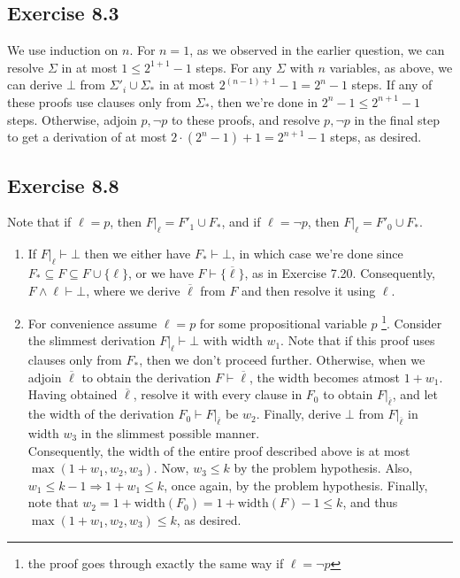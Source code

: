 \documentclass{article}
\begin{document}
\subsection*{Exercise 8.3}
We use induction on $n$. For $n = 1$, as we observed in the earlier question, we can resolve $\Sigma$ in at most $1\leq 2^{1+1}-1$ steps. For any $\Sigma$ with $n$ variables, as above, we can derive $\bot$ from $\Sigma'_i\cup\Sigma_*$ in at most $2^{(n-1)+1}-1 = 2^n - 1$ steps. If any of these proofs use clauses only from $\Sigma_*$, then we're done in $2^{n} - 1\leq 2^{n+1} - 1$ steps. Otherwise, adjoin $p, \lnot p$ to these proofs, and resolve $p, \lnot p$ in the final step to get a derivation of at most $2\cdot (2^n - 1) + 1 = 2^{n+1} - 1$ steps, as desired.
\subsection*{Exercise 8.8}
Note that if $\ell = p$, then $F|_\ell = F'_1\cup F_*$, and if $\ell = \lnot p$, then $F|_\ell = F'_0\cup F_*$. \\
\begin{enumerate}
    \item If $F|_\ell\vdash\bot$ then we either have $F_*\vdash\bot$, in which case we're done since $F_*\subseteq F\subseteq F\cup\{\ell\}$, or we have $F\vdash\{\overline{\ell}\}$, as in Exercise 7.20. Consequently, $F\wedge\ell\vdash\bot$, where we derive $\overline{\ell}$ from $F$ and then resolve it using $\ell$. 
    \item For convenience assume $\ell = p$ for some propositional variable $p$ \footnote{the proof goes through exactly the same way if $\ell = \lnot p$}. Consider the slimmest derivation $F|_\ell\vdash\bot$ with width $w_1$. Note that if this proof uses clauses only from $F_*$, then we don't proceed further. Otherwise, when we adjoin $\overline{\ell}$ to obtain the derivation $F\vdash\overline{\ell}$, the width becomes atmost $1 + w_1$. Having obtained $\overline{\ell}$, resolve it with every clause in $F_0$ to obtain $F|_{\overline{\ell}}$, and let the width of the derivation $F_0\vdash F|_{\overline{\ell}}$ be $w_2$. Finally, derive $\bot$ from $F|_{\overline{\ell}}$ in width $w_3$ in the slimmest possible manner.\\
    Consequently, the width of the entire proof described above is at most $\max(1 + w_1, w_2, w_3)$. Now, $w_3\leq k$ by the problem hypothesis. Also, $w_1\leq k - 1\Rightarrow 1 + w_1\leq k$, once again, by the problem hypothesis. Finally, note that $w_2 = 1 + \mathrm{width}(F_0) = 1 + \mathrm{width}(F) - 1 \leq k$, and thus $\max(1 + w_1, w_2, w_3)\leq k$, as desired.
\end{enumerate}
\end{document}
